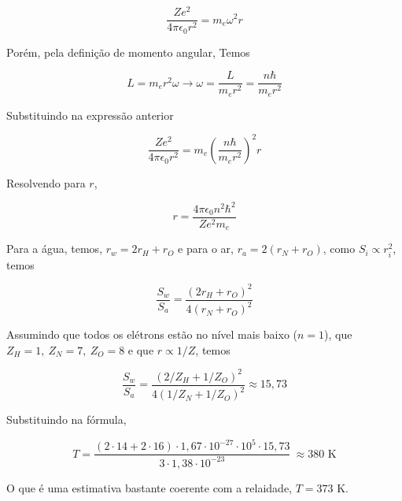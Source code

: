 \documentclass[11pt]{article}
\begin{document}
\begin{pproblem}
\begin{pssolution*}{}{}
\begin{alternativas}
    \[\frac{Ze^2}{4\pi \epsilon_0r^2} = m_e \omega^2 r\]

    Porém, pela definição de momento angular, Temos

    \[L = m_er^2\omega \rightarrow \omega = \frac{L}{m_er^2} = \frac{n\hbar}{m_er^2}\]

    Substituindo na expressão anterior 

    \[\frac{Ze^2}{4\pi\epsilon_0 r^2} = m_e \left(\frac{n\hbar}{m_er^2}\right)^2 r\]

    Resolvendo para \(r\), 

    \[r = \frac{4\pi\epsilon_0 n^2\hbar ^2}{Z e^2 m_e}\]

    \item Para a água, temos, \(r_w = 2r_H + r_O\) e para o ar, \(r_a = 2(r_N + r_O)\), como \(S_i \propto r_i^2\), temos 
    
    \[\frac{S_w}{S_a} = \frac{(2r_H + r_O)^2}{4(r_N + r_O)^2}\]

    Assumindo que todos os elétrons estão no nível mais baixo (\(n=1\)), que \(Z_H = 1, \ Z_N = 7, \ Z_O = 8\) e que \(r\propto 1/Z\), temos 
    
    \[\boxed{\frac{S_w}{S_a}=\frac{(2/Z_H + 1/Z_O)^2}{4(1/Z_N + 1/Z_O)^2} \approx 15,73}\]

    \item Substituindo na fórmula, 

    \[T = \frac{(2\cdot 14 + 2 \cdot 16) \cdot 1,67 \cdot 10^{-27} \cdot 10^{5} \cdot 15,73}{3 \cdot 1,38\cdot 10^{-23}} \ \boxed{\approx 380\text{ K}}\]

    O que é uma estimativa bastante coerente com a relaidade, \(T = 373\) K.
\end{alternativas}
    



    
    
\end{pssolution*}
\end{pproblem}
\end{document}
